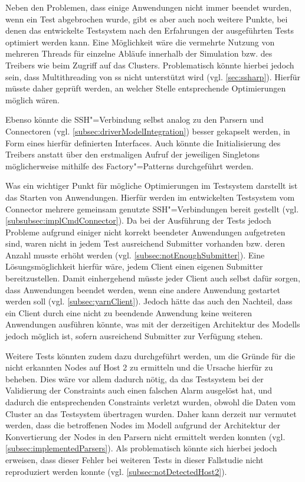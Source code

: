 Neben den Problemen, dass einige Anwendungen nicht immer beendet wurden, wenn ein Test abgebrochen wurde, gibt es aber auch noch weitere Punkte, bei denen das entwickelte Testsystem nach den Erfahrungen der ausgeführten Tests optimiert werden kann.
Eine Möglichkeit wäre \zB die vermehrte Nutzung von mehreren Threads für einzelne Abläufe innerhalb der Simulation bzw. des Treibers wie beim Zugriff auf das Clusters.
Problematisch könnte hierbei jedoch sein, dass Multithreading von \gls{ss} nicht unterstützt wird (vgl. \cref{sec:ssharp}).
Hierfür müsste daher geprüft werden, an welcher Stelle entsprechende Optimierungen möglich wären.

Ebenso könnte die SSH"=Verbindung selbst analog zu den Parsern und Connectoren (vgl. \cref{subsec:driverModelIntegration}) besser gekapselt werden, \zB in Form eines hierfür definierten Interfaces.
Auch könnte die Initialisierung des Treibers anstatt über den erstmaligen Aufruf der jeweiligen Singletons möglicherweise mithilfe des Factory"=Patterns durchgeführt werden.

Was ein wichtiger Punkt für mögliche Optimierungen im Testsystem darstellt ist das Starten von Anwendungen.
Hierfür werden im entwickelten Testsystem vom Connector mehrere gemeinsam genutzte SSH"=Verbindungen bereit gestellt (vgl. \cref{subsubsec:implCmdConnector}).
Da bei der Ausführung der Tests jedoch Probleme aufgrund einiger nicht korrekt beendeter Anwendungen aufgetreten sind, waren nicht in jedem Test ausreichend Submitter vorhanden bzw. deren Anzahl musste erhöht werden (vgl. \cref{subsec:notEnoughSubmitter}).
Eine Lösungsmöglichkeit hierfür wäre, jedem Client einen eigenen Submitter bereitzustellen.
Damit einhergehend müsste jeder Client auch selbst dafür sorgen, dass Anwendungen beendet werden, wenn eine andere Anwendung gestartet werden soll (vgl. \cref{subsec:yarnClient}).
Jedoch hätte das auch den Nachteil, dass ein Client durch eine nicht zu beendende Anwendung keine weiteren Anwendungen ausführen könnte, was mit der derzeitigen Architektur des Modells jedoch möglich ist, sofern ausreichend Submitter zur Verfügung stehen.

Weitere Tests könnten zudem dazu durchgeführt werden, um die Gründe für die nicht erkannten Nodes auf Host 2 zu ermitteln und die Ursache hierfür zu beheben.
Dies wäre vor allem dadurch nötig, da das Testsystem bei der Validierung der Constraints auch einen falschen Alarm ausgelöst hat, und dadurch die entsprechenden Constraints verletzt wurden, obwohl die Daten vom Cluster an das Testsystem übertragen wurden.
Daher kann derzeit nur vermutet werden, dass die betroffenen Nodes im Modell aufgrund der Architektur der Konvertierung der Nodes in den Parsern nicht ermittelt werden konnten (vgl. \cref{subsec:implementedParsers}).
Als problematisch könnte sich hierbei jedoch erweisen, dass dieser Fehler bei weiteren Tests in dieser Fallstudie nicht reproduziert werden konnte (vgl. \cref{subsec:notDetectedHost2}).

